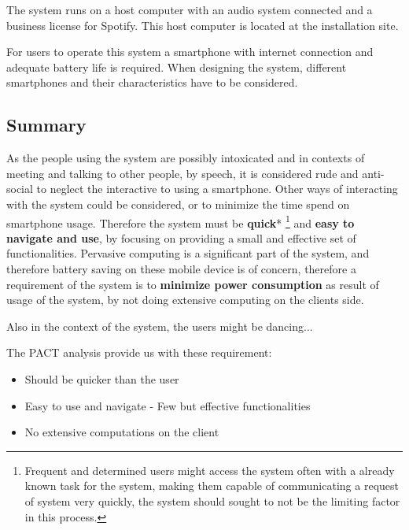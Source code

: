 The system runs on a host computer with an audio system connected and a business license for Spotify.  This host computer is located at the installation site.

For users to operate this system a smartphone with internet connection and adequate battery life is required. 
When designing the system, different smartphones and their characteristics have to be considered.

\subsection{Summary}
\label{sec:pact_summary}

As the people using the system are possibly intoxicated and in contexts of meeting and talking to other people, by speech, it is considered rude and anti-social to neglect the interactive to using a smartphone. Other ways of interacting with the system could be considered, or to minimize the time spend on smartphone usage. Therefore the system must be \textbf{quick}* \footnote{Frequent and determined users might access the system often with a already known task for the system, making them capable of communicating a request of system very quickly, the system should sought to not be the limiting factor in this process.} and \textbf{easy to navigate and use}, by focusing on providing a small and effective set of functionalities. Pervasive computing is a significant part of the system, and therefore battery saving on these mobile device is of concern, therefore a requirement of the system is to \textbf{minimize power consumption} as result of usage of the system, by not doing extensive computing on the clients side.

Also in the context of the system, the users might be dancing... 

The PACT analysis provide us with these requirement:
\begin{itemize}
  \item Should be quicker than the user
  \item Easy to use and navigate - Few but effective functionalities
  \item No extensive computations on the client
\end{itemize}
